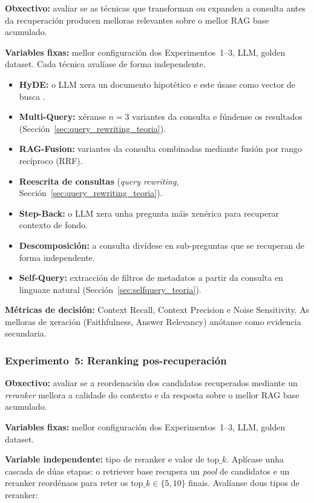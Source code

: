 \documentclass[11pt, a4paper, oneside]{report}
\begin{document}
\textbf{Obxectivo:} avaliar se as técnicas que transforman ou expanden a consulta antes
da recuperación producen melloras relevantes sobre o mellor RAG base acumulado.

\textbf{Variables fixas:} mellor configuración dos Experimentos~1--3, LLM, golden
dataset. Cada técnica avalíase de forma independente.

\begin{itemize}
  \item \textbf{HyDE:} o LLM xera un documento hipotético e este úsase como vector de
    busca \citep{gao2022precise}.
  \item \textbf{Multi-Query:} xéranse $n = 3$ variantes da consulta e fúndense os
    resultados (Sección~\ref{sec:query_rewriting_teoria}).
  \item \textbf{RAG-Fusion:} variantes da consulta combinadas mediante fusión por rango
    recíproco (\ac{RRF}).
  \item \textbf{Reescrita de consultas} (\textit{query rewriting},
    Sección~\ref{sec:query_rewriting_teoria}).
  \item \textbf{Step-Back:} o LLM xera unha pregunta máis xenérica para recuperar
    contexto de fondo.
  \item \textbf{Descomposición:} a consulta divídese en sub-preguntas que se recuperan
    de forma independente.
  \item \textbf{Self-Query:} extracción de filtros de metadatos a partir da consulta
    en linguaxe natural (Sección~\ref{sec:selfquery_teoria}).
\end{itemize}

\textbf{Métricas de decisión:} Context Recall, Context Precision e Noise Sensitivity.
As melloras de xeración (Faithfulness, Answer Relevancy) anótanse como evidencia
secundaria.

\subsubsection{Experimento~5: Reranking pos-recuperación}
\label{sec:exp5_reranking}

\textbf{Obxectivo:} avaliar se a reordenación dos candidatos recuperados mediante un
\textit{reranker} mellora a calidade do contexto e da resposta sobre o mellor RAG base
acumulado.

\textbf{Variables fixas:} mellor configuración dos Experimentos~1--3, LLM, golden
dataset.

\textbf{Variable independente:} tipo de reranker e valor de $\text{top}\_k$. Aplícase
unha cascada de dúas etapas: o retriever base recupera un \textit{pool} de candidatos
e un reranker reordénaos para reter os $\text{top}\_k \in \{5, 10\}$ finais. Avalíanse
dous tipos de reranker:
\end{document}
